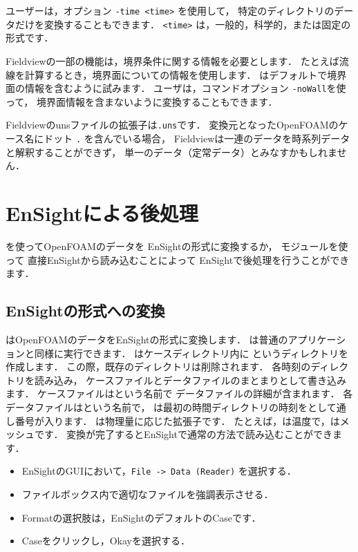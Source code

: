 ユーザーは，オプション \verb|-time <time>| を使用して，
特定のディレクトリのデータだけを変換することもできます．
\verb|<time>| は，一般的，科学的，または固定の形式です．

Fieldviewの一部の機能は，境界条件に関する情報を必要とします．
たとえば流線を計算するとき，境界面についての情報を使用します．
はデフォルトで境界面の情報を含むように試みます．
ユーザは，コマンドオプション \verb|-noWall|を使って，
境界面情報を含まないように変換することもできます．

Fieldviewのunsファイルの拡張子は\texttt{.uns}です．
変換元となったOpenFOAMのケース名にドット \texttt{.} を含んでいる場合，
Fieldviewは一連のデータを時系列データと解釈することができず，
単一のデータ（定常データ）とみなすかもしれません．



\section{EnSightによる後処理}
\label{sec:6.4}
を使ってOpenFOAMのデータを
EnSightの形式に変換するか，
モジュールを使って
直接EnSightから読み込むことによって
EnSightで後処理を行うことができます．


\subsection{EnSightの形式への変換}
\label{ssec:6.4.1}
はOpenFOAMのデータをEnSightの形式に変換します．
は普通のアプリケーションと同様に実行できます．
はケースディレクトリ内に
というディレクトリを作成します．
この際，既存のディレクトリは削除されます．
各時刻のディレクトリを読み込み，
ケースファイルとデータファイルのまとまりとして書き込みます．
ケースファイルはという名前で
データファイルの詳細が含まれます．
各データファイルはという名前で，
は最初の時間ディレクトリの時刻をとして通し番号が入ります．
は物理量に応じた拡張子です．
たとえば，は温度で，はメッシュです．
変換が完了するとEnSightで通常の方法で読み込むことができます．
\begin{itemize}
 \item EnSightのGUIにおいて，\texttt{File -> Data (Reader)} を選択する．
 \item ファイルボックス内で適切なファイルを強調表示させる．
 \item Formatの選択肢は，EnSightのデフォルトのCaseです．
 \item Caseをクリックし，Okayを選択する．
\end{itemize}


